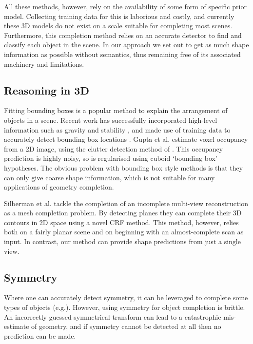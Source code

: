 \documentclass[10pt,twocolumn,letterpaper]{article}
\makeatletter
\renewcommand*{\eg}{e.g.\@\xspace}
\newcommand*{\ea}{et al.\@\xspace}
\makeatother
\begin{document}
All these methods, however, rely on the availability of some form of specific prior model.
Collecting training data for this is laborious and costly, and currently these 3D models do not exist on a scale suitable for completing most scenes.
Furthermore, this completion method relies on an accurate detector to find and classify each object in the scene.
In our approach we set out to get as much shape information as possible without semantics, thus remaining free of its associated machinery and limitations.

\subsection{Reasoning in 3D}
Fitting bounding boxes is a popular method to explain the arrangement of objects in a scene.
Recent work has successfully incorporated high-level information such as gravity and stability
 \cite{shao-siggraphasia-2014, jia-cvpr-2013}, and made use of training data to accurately detect bounding box locations \cite{hedau-cvpr-2012}.
 Gupta \ea \cite{gupta-cvpr-2011} estimate voxel occupancy from a 2D image, using the clutter detection method of \cite{hedau-iccv-2009}. This occupancy prediction is highly noisy, so is regularised using cuboid `bounding box' hypotheses.
The obvious problem with bounding box style methods is that they can only give coarse shape information, which is not suitable for many applications of geometry completion.

Silberman \ea \cite{silberman-eccv-2014} tackle the completion of an incomplete multi-view reconstruction as a mesh completion problem.
By detecting planes they can complete their 3D contours in 2D space using a novel CRF method.
This method, however, relies both on a fairly planar scene and on beginning with an almost-complete scan as input.
In contrast, our method can provide shape predictions from just a single view.

\subsection{Symmetry}
Where one can accurately detect symmetry, it can be leveraged to complete some types of objects (\eg \cite{law-cviu-2010, thrun-iccv-2005, kroemer-humanoids-2012}). 
However, using symmetry for object completion is brittle.
An incorrectly guessed symmetrical transform can lead to a catastrophic mis-estimate of geometry, and if symmetry cannot be detected at all then no prediction can be made.
\end{document}
